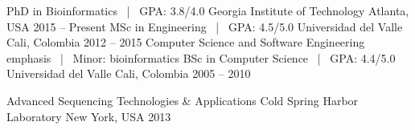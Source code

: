 


\begin{cventries}



\cventry
{PhD in Bioinformatics ~|~ GPA: 3.8/4.0} %
{Georgia Institute of Technology} %
{Atlanta, USA} %
{2015 -- Present} %
{ 
}
\vspace{-2.0mm}
\cventry
{MSc in Engineering ~|~ GPA: 4.5/5.0} %
{Universidad del Valle} %
{Cali, Colombia} %
{2012 -- 2015} %
{ 
Computer Science and Software Engineering emphasis ~|~ Minor: bioinformatics \newline
}
\vspace{-2.0mm}
\cventry
{BSc in Computer Science ~|~ GPA: 4.4/5.0} %
{Universidad del Valle} %
{Cali, Colombia} %
{2005 -- 2010} %
{ 
}
\vspace{-6.0mm}

\end{cventries}


\begin{cventries}
\cventry
{Advanced Sequencing Technologies \& Applications} %
{Cold Spring Harbor Laboratory} %
{New York, USA} %
{2013} %
{ 
}
\end{cventries}
\vspace{-4.0mm}